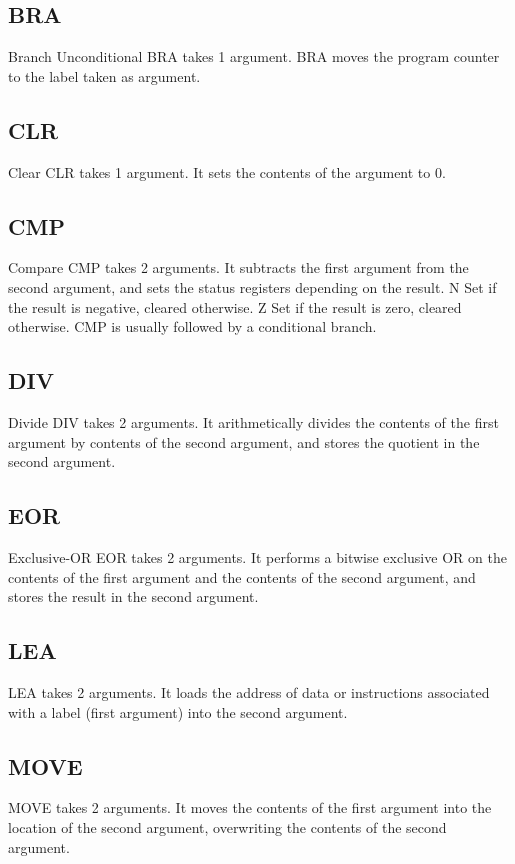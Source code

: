 \documentclass[10pt,fullpage]{article}
\begin{document}
\subsection*{BRA}
Branch Unconditional BRA takes 1 argument. BRA moves the program
counter to the label taken as argument.

\subsection*{CLR}
Clear CLR takes 1 argument. It sets the contents of the argument to
0.

\subsection*{CMP}
Compare CMP takes 2 arguments. It subtracts the first argument from
the second argument, and sets the status registers depending on the
result. N Set if the result is negative, cleared otherwise. Z Set if
the result is zero, cleared otherwise. CMP is usually followed by a
conditional branch.

\subsection*{DIV}
Divide DIV takes 2 arguments. It arithmetically divides the contents
of the first argument by contents of the second argument, and stores
the quotient in the second argument.

\subsection*{EOR}
Exclusive-OR EOR takes 2 arguments. It performs a bitwise exclusive
OR on the contents of the first argument and the contents of the
second argument, and stores the result in the second argument.

\subsection*{LEA}
LEA takes 2 arguments. It loads the address of data or instructions
associated with a label (first argument) into the second argument.

\subsection*{MOVE}
MOVE takes 2 arguments. It moves the contents of the first argument
into the location of the second argument, overwriting the contents
of the second argument.
\end{document}
